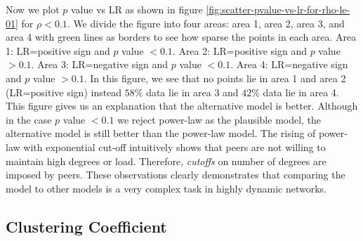 \documentclass[10pt,conference,letterpaper,final]{IEEEtran}
\begin{document}
Now we plot $p$ value vs LR as shown in figure \ref{fig:scatter-pvalue-vs-lr-for-rho-le-01} for $\rho < 0.1$.
We divide the figure into four areas: area 1, area 2, area 3, and area 4  with green lines as borders to see how sparse the points in each area.
Area 1: LR=positive sign and $p$ value $<0.1$.
Area 2: LR=positive sign and $p$ value $>0.1$.
Area 3: LR=negative sign and $p$ value $<0.1$.
Area 4: LR=negative sign and $p$ value $>0.1$. 
In this figure, we see that no points lie in area 1 and area 2 (LR=positive sign) instead $58\%$ data lie in area 3 and $42\%$ data lie in area 4.
This figure gives us an explanation that the alternative model is better.  
Although in the case $p$ value $<0.1$ we reject power-law as the plausible model, the alternative model is still better than the power-law model. 
The rising of power-law with exponential cut-off intuitively shows that peers are not willing to maintain high degrees or load.
Therefore, \textit{cutoffs} on number of degrees are imposed by peers.
These observations clearly demonstrates that comparing the model to other models is a very complex task in highly dynamic networks.

\subsection{Clustering Coefficient}\label{clusteringcoef}
\end{document}
